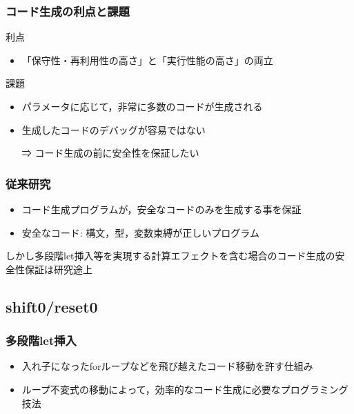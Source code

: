 \documentclass[dvipdfmx,cjk,xcolor=dvipsnames,envcountsect,notheorems,12pt]{beamer}
\theoremstyle{definition}
\begin{document}
\begin{frame}
  \frametitle{コード生成の利点と課題}

  利点
  \begin{itemize}
  \item \alert{「保守性・再利用性の高さ」}と\alert{「実行性能の高さ」}の両立
  \end{itemize}

  \pause

  課題
  \begin{itemize}
  \item パラメータに応じて，非常に多数のコードが生成される
  \item 生成したコードのデバッグが容易ではない
  \item [⇒] \alert{コード生成の前に安全性を保証}したい
  \end{itemize}
\end{frame}

\begin{frame}
  \frametitle{従来研究}
  \begin{itemize}
  \item コード生成プログラムが，安全なコードのみを生成する事を保証
  \item 安全なコード: 構文，型，変数束縛が正しいプログラム
  \end{itemize}

  \pause

  しかし\alert{多段階let挿入}等を実現する\alert{計算エフェクト}を含む場合のコード生成の安全性保証は研究途上
\end{frame}

\subsection{shift0/reset0}

\begin{frame}
  \frametitle{多段階let挿入}

  \begin{itemize}
  \item 入れ子になったforループなどを飛び越えた\alert{コード移動}を許す仕組み
  \item ループ不変式の移動によって，\alert{効率的なコード生成}に必要なプログラミング技法
  \end{itemize}
\end{frame}
\end{document}
